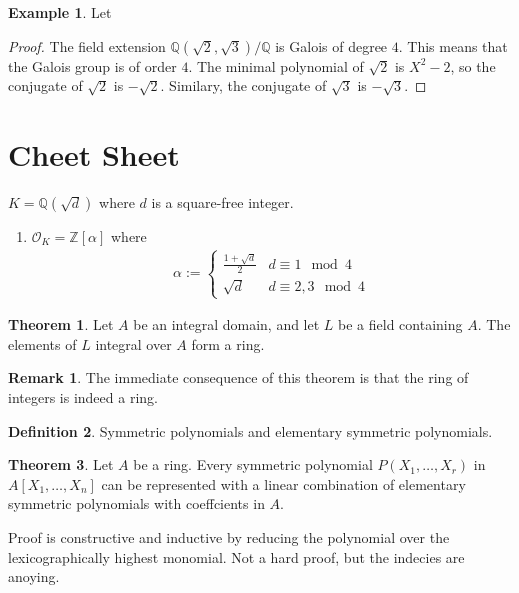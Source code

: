 \documentclass[a4paper]{book}
\theoremstyle{definition}
\newtheorem{definition}{Definition}[]
\newtheorem{example}{Example}[definition]
\newtheorem{theorem}[definition]{Theorem}
\newtheorem*{remark}{Remark}
\begin{document}
\begin{example}
    Let \(\)
\end{example}
\begin{proof}
    The field extension \(\mathbb{Q}(\sqrt{2}, \sqrt{3}) / \mathbb{Q}\) is Galois of degree \(4\). This means that the Galois group is of order \(4\). The minimal polynomial of \(\sqrt{2}\) is \(X^2 - 2\), so the conjugate of \(\sqrt{2}\) is \(-\sqrt{2}\). Similary, the conjugate of \(\sqrt{3}\) is \(-\sqrt{3}\).
\end{proof}

\part{Cheet Sheet}


\noindent \(K = \mathbb{Q}(\sqrt{d})\) where \(d\) is a square-free integer.
\begin{enumerate}
    \item \(\mathcal{O}_K = \mathbb{Z}[\alpha]\) where
    \begin{align*}
        \alpha := \begin{cases}
            \frac{1 + \sqrt{d}}{2} & d \equiv 1 \mod{4} \\
            \sqrt{d} & d \equiv 2, 3 \mod{4}
        \end{cases}
    \end{align*}
\end{enumerate}

\begin{thmbox}
    \begin{theorem}
        Let \(A\) be an integral domain, and let \(L\) be a field containing \(A\). The elements of \(L\) integral over \(A\) form a ring.
    \end{theorem}
\end{thmbox}
\begin{remark}
    The immediate consequence of this theorem is that the ring of integers is indeed a ring.
\end{remark}
\begin{defbox}
    \begin{definition}
        Symmetric polynomials and elementary symmetric polynomials.
    \end{definition}
\end{defbox}
\begin{thmbox}
    \begin{theorem}
        Let \(A\) be a ring. Every symmetric polynomial \(P(X_1, \ldots, X_r)\) in \(A[X_1, \ldots, X_n]\) can be represented with a linear combination of elementary symmetric polynomials with coeffcients in \(A\).
    \end{theorem}
\end{thmbox}
Proof is constructive and inductive by reducing the polynomial over the lexicographically highest monomial. Not a hard proof, but the indecies are anoying.
\end{document}
